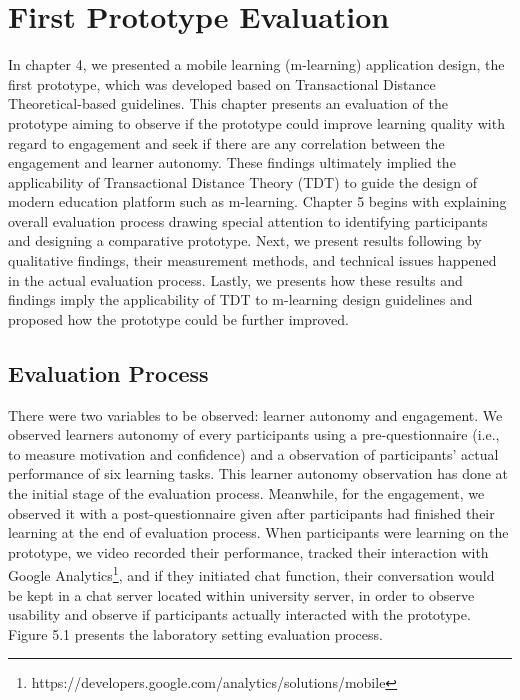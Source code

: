 \chapter{First Prototype Evaluation}\label{C:bin}

In chapter 4, we presented a mobile learning (m-learning) application design, the first prototype, which was developed based on Transactional Distance Theoretical-based guidelines. This chapter presents an evaluation of the prototype aiming to observe if the prototype could improve learning quality with regard to engagement and seek if there are any correlation between the engagement and learner autonomy. These findings ultimately implied the applicability of Transactional Distance Theory (TDT) to guide the design of modern education platform such as m-learning. Chapter 5 begins with explaining overall evaluation process drawing special attention to identifying participants and designing a comparative prototype. Next, we present results following by qualitative findings, their measurement methods, and technical issues happened in the actual evaluation process. Lastly, we presents how these results and findings imply the applicability of TDT to m-learning design guidelines and proposed how the prototype could be further improved. 

\section{Evaluation Process} 

There were two variables to be observed: learner autonomy and engagement. We observed learners autonomy of every participants using a pre-questionnaire (i.e., to measure motivation and confidence) and a observation of participants' actual performance of six learning tasks. This learner autonomy observation has done at the initial stage of the evaluation process. Meanwhile, for the engagement, we observed it with a post-questionnaire given after participants had finished their learning at the end of evaluation process. When participants were learning on the prototype, we video recorded their performance, tracked their interaction with Google Analytics\footnote{https://developers.google.com/analytics/solutions/mobile}, and if they initiated chat function, their conversation would be kept in a chat server located within university server, in order to observe usability and observe if participants actually interacted with the prototype. Figure 5.1 presents the laboratory setting evaluation process. 

